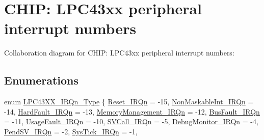 \hypertarget{group___c_m_s_i_s__43_x_x___i_r_q}{}\section{C\+H\+IP\+: L\+P\+C43xx peripheral interrupt numbers}
\label{group___c_m_s_i_s__43_x_x___i_r_q}
Collaboration diagram for C\+H\+IP\+: L\+P\+C43xx peripheral interrupt numbers\+:
\subsection*{Enumerations}
\begin{DoxyCompactItemize}
\item 
enum \hyperlink{group___c_m_s_i_s__43_x_x___i_r_q_ga2018a6433701e9ee9b34797425127919}{L\+P\+C43\+X\+X\+\_\+\+I\+R\+Qn\+\_\+\+Type} \{ \newline
\hyperlink{group___c_m_s_i_s__43_x_x___i_r_q_gga2018a6433701e9ee9b34797425127919a50ad21f2fd0d54d04b390d5a9145889a}{Reset\+\_\+\+I\+R\+Qn} = -\/15, 
\hyperlink{group___c_m_s_i_s__43_x_x___i_r_q_gga2018a6433701e9ee9b34797425127919ade177d9c70c89e084093024b932a4e30}{Non\+Maskable\+Int\+\_\+\+I\+R\+Qn} = -\/14, 
\hyperlink{group___c_m_s_i_s__43_x_x___i_r_q_gga2018a6433701e9ee9b34797425127919ab1a222a34a32f0ef5ac65e714efc1f85}{Hard\+Fault\+\_\+\+I\+R\+Qn} = -\/13, 
\hyperlink{group___c_m_s_i_s__43_x_x___i_r_q_gga2018a6433701e9ee9b34797425127919a33ff1cf7098de65d61b6354fee6cd5aa}{Memory\+Management\+\_\+\+I\+R\+Qn} = -\/12, 
\newline
\hyperlink{group___c_m_s_i_s__43_x_x___i_r_q_gga2018a6433701e9ee9b34797425127919a8693500eff174f16119e96234fee73af}{Bus\+Fault\+\_\+\+I\+R\+Qn} = -\/11, 
\hyperlink{group___c_m_s_i_s__43_x_x___i_r_q_gga2018a6433701e9ee9b34797425127919a6895237c9443601ac832efa635dd8bbf}{Usage\+Fault\+\_\+\+I\+R\+Qn} = -\/10, 
\hyperlink{group___c_m_s_i_s__43_x_x___i_r_q_gga2018a6433701e9ee9b34797425127919a4ce820b3cc6cf3a796b41aadc0cf1237}{S\+V\+Call\+\_\+\+I\+R\+Qn} = -\/5, 
\hyperlink{group___c_m_s_i_s__43_x_x___i_r_q_gga2018a6433701e9ee9b34797425127919a8e033fcef7aed98a31c60a7de206722c}{Debug\+Monitor\+\_\+\+I\+R\+Qn} = -\/4, 
\newline
\hyperlink{group___c_m_s_i_s__43_x_x___i_r_q_gga2018a6433701e9ee9b34797425127919a03c3cc89984928816d81793fc7bce4a2}{Pend\+S\+V\+\_\+\+I\+R\+Qn} = -\/2, 
\hyperlink{group___c_m_s_i_s__43_x_x___i_r_q_gga2018a6433701e9ee9b34797425127919a6dbff8f8543325f3474cbae2446776e7}{Sys\+Tick\+\_\+\+I\+R\+Qn} = -\/1, 

\end{DoxyCompactItemize}
